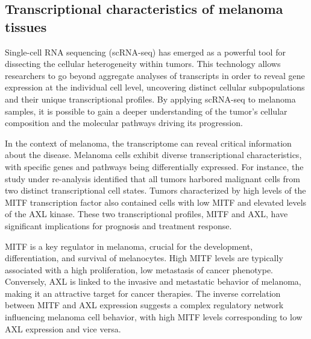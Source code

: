 \documentclass[11pt]{article}
\begin{document}
\subsection{Transcriptional characteristics of melanoma tissues}
\begin{multicols}{2}
    \noindent
    Single-cell RNA sequencing (scRNA-seq) has emerged as a powerful tool for dissecting the cellular heterogeneity within tumors\cite{chen_single-cell_2023}. This technology allows researchers to go beyond aggregate analyses of transcripts in order to reveal gene expression at the individual cell level, uncovering distinct cellular subpopulations and their unique transcriptional profiles. By applying scRNA-seq to melanoma samples, it is possible to gain a deeper understanding of the tumor's cellular composition and the molecular pathways driving its progression.
    
    In the context of melanoma, the transcriptome can reveal critical information about the disease. Melanoma cells exhibit diverse transcriptional characteristics, with specific genes and pathways being differentially expressed. For instance, the study under re-analysis identified that all tumors harbored malignant cells from two distinct transcriptional cell states. Tumors characterized by high levels of the MITF transcription factor also contained cells with low MITF and elevated levels of the AXL kinase. These two transcriptional profiles, MITF and AXL, have significant implications for prognosis and treatment response\cite{muller_low_2014}.
    
    MITF is a key regulator in melanoma, crucial for the development, differentiation, and survival of melanocytes. High MITF levels are typically associated with a high proliferation, low metastasis of cancer phenotype. Conversely, AXL is linked to the invasive and metastatic behavior of melanoma, making it an attractive target for cancer therapies\cite{simmons_brn2_2022}. The inverse correlation between MITF and AXL expression suggests a complex regulatory network influencing melanoma cell behavior, with high MITF levels corresponding to low AXL expression and vice versa.

\end{multicols}
    
\end{document}
